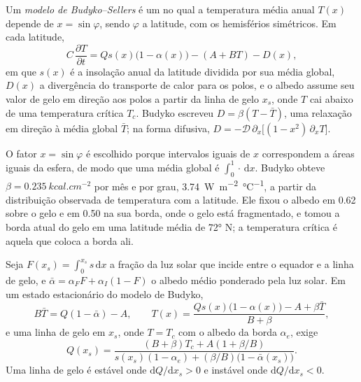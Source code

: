 \begin{definition}\label{def:b3:climate-models:budyko-sellers}
Um \emph{modelo de Budyko--Sellers} é um
 no qual a temperatura média anual $T(x)$ depende de
$x = \sin\varphi$, sendo $\varphi$ a latitude, com os hemisférios simétricos.
Em cada latitude,
\[
C\,\frac{\partial T}{\partial t} = Qs(x)\big(1 - \alpha(x)\big) - (A + BT) - D(x) ,
\]
em que $s(x)$ é a insolação anual da latitude dividida por sua média global,
$D(x)$ a divergência do transporte de calor para os polos, e o albedo
assume seu valor de gelo em direção aos polos a partir da linha de gelo $x_s$, onde $T$ cai abaixo de uma
temperatura crítica $T_c$. Budyko escreveu $D = \beta(T - \bar T)$, uma
relaxação em direção à média global $\bar T$; na forma difusiva, $D =
-\mathcal D\,\partial_x\big[(1 - x^2)\,\partial_xT\big]$.
\end{definition}

O fator $x = \sin\varphi$ é escolhido porque intervalos iguais de $x$ correspondem
a áreas iguais da esfera, de modo que uma média global é $\int_0^1\cdot\,\mathrm
dx$. Budyko obteve $\beta = \qty{0.235}{kcal.cm^{-2}}$ por mês e por
grau, \qty{3.74}{W.m^{-2}.\celsius^{-1}}, a partir da distribuição observada
de temperatura com a latitude. Ele fixou o albedo em 0.62 sobre o gelo e em 0.50 na sua borda,
onde o gelo está fragmentado, e tomou a borda atual do gelo em uma latitude média
de \ang{72} N; a temperatura crítica é aquela que coloca a borda
ali.

\begin{proposition}\label{prop:b3:climate-models:iceline}
Seja $F(x_s) = \int_0^{x_s}s\,\mathrm dx$ a fração da luz solar que
incide entre o equador e a linha de gelo, e $\bar\alpha = \alpha_FF + \alpha_I(1 -
F)$ o albedo médio ponderado pela luz solar. Em um estado estacionário
do modelo de Budyko,
\[
B\bar T = Q(1 - \bar\alpha) - A, \qquad
T(x) = \frac{Qs(x)\big(1 - \alpha(x)\big) - A + \beta\bar T}{B + \beta} ,
\]
e uma linha de gelo em $x_s$, onde $T = T_c$ com o albedo da borda $\alpha_e$,
exige
\[
Q(x_s) = \frac{(B + \beta)T_c + A(1 + \beta/B)}{s(x_s)(1 - \alpha_e) +
(\beta/B)\big(1 - \bar\alpha(x_s)\big)} .
\]
Uma linha de gelo é estável onde $\mathrm dQ/\mathrm dx_s > 0$ e instável
onde $\mathrm dQ/\mathrm dx_s < 0$.
\end{proposition}

